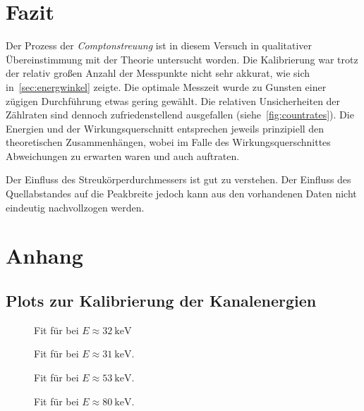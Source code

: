 \documentclass[slug=CS, room=Andreas-Schubert-Bau\,\ Labor\ 406,
supervisor=Juliane\ Volkmer, coursedate=29.\ 11.\ 2019]{../../Lab_Report_LaTeX/lab_report}
\newcommand{\cs}{\emph{Comptonstreuung}}
\newcommand{\kev}[1]{\SI{#1}{\kilo\electronvolt}}
\begin{document}
\section{Fazit}
Der Prozess der \cs{} ist in diesem Versuch in qualitativer
Übereinstimmung mit der Theorie untersucht worden. Die Kalibrierung
war trotz der relativ gro\ss{}en Anzahl der Messpunkte nicht sehr akkurat,
wie sich in~\ref{sec:energwinkel} zeigte. Die optimale Messzeit wurde
zu Gunsten einer z\"ugigen Durchf\"uhrung etwas gering gew\"ahlt. Die
relativen Unsicherheiten der Zählraten sind dennoch zufriedenstellend
ausgefallen (siehe~\ref{fig:countrates}). Die Energien und der
Wirkungsquerschnitt entsprechen jeweils prinzipiell den theoretischen
Zusammenh\"angen, wobei im Falle des Wirkungsquerschnittes
Abweichungen zu erwarten waren und auch auftraten.

Der Einfluss des Streukörperdurchmessers ist gut zu verstehen. Der
Einfluss des Quellabstandes auf die Peakbreite jedoch kann aus den
vorhandenen Daten nicht eindeutig nachvollzogen werden.

\section{Anhang}
\label{sec:anshang}

\subsection{Plots zur Kalibrierung der Kanalenergien}
\label{sec:ancalplot}

\begin{figure}[H]\centering
  
  \caption{Fit f\"ur  bei \(E \approx \kev{32}\)}
\end{figure}

\begin{figure}[H]\centering
  
  \caption{Fit f\"ur  bei \(E \approx \kev{31}\).}
\end{figure}

\begin{figure}[H]\centering
  
  \caption{Fit f\"ur  bei \(E \approx \kev{53}\).}
\end{figure}

\begin{figure}[H]\centering
  
  \caption{Fit f\"ur  bei \(E \approx \kev{80}\).}
\end{figure}
\end{document}

